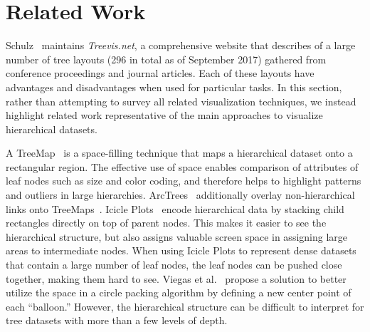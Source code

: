 \documentclass[a4paper]{llncs}
\begin{document}
\section{Related Work}



Schulz~\cite{TreeVisSchulz} maintains \textit{Treevis.net}, a comprehensive website that describes of a large number of tree layouts (296 in total as of September 2017) gathered from conference proceedings and journal articles. Each of these layouts have advantages and disadvantages when used for particular tasks.
In this section, rather than attempting to survey all related visualization techniques, we instead highlight related work representative of the main approaches to visualize hierarchical datasets.

A TreeMap~\cite{shneiderman1992tree} is a space-filling technique that maps a hierarchical dataset onto a rectangular region. The effective use of space enables comparison of attributes of leaf nodes such as size and color coding, and therefore helps to highlight patterns and outliers in large hierarchies. ArcTrees~\cite{Neumann2005ArcTrees} additionally overlay non-hierarchical links onto TreeMaps~\cite{fekete2003interactive}. Icicle Plots~\cite{Kruskal1983IciclePlots} encode hierarchical data by stacking child rectangles directly on top of parent nodes. This makes it easier to see the hierarchical structure, but also assigns valuable screen space in assigning large areas to intermediate nodes. When using Icicle Plots to represent dense datasets that contain a large number of leaf nodes, the leaf nodes can be pushed close together, making them hard to see. Viegas et al.~\cite{viegas2013google} propose a solution to better utilize the space in a circle packing algorithm by defining a new center point of each ``balloon.'' However, the hierarchical structure can be difficult to interpret for tree datasets with more than a few levels of depth. 
\end{document}
